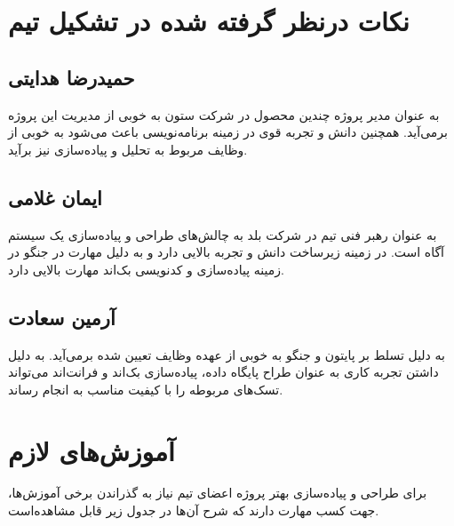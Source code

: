 \section{نکات درنظر گرفته شده در تشکیل تیم}
\subsection{حمیدرضا هدایتی}
به عنوان مدیر پروژه چندین محصول در شرکت ستون به خوبی از مدیریت این پروژه برمی‌آید. همچنین دانش و تجربه قوی در زمینه برنامه‌نویسی باعث می‌شود به خوبی از وظایف مربوط به تحلیل و پیاده‌سازی نیز برآید.
 \subsection{ایمان غلامی}
به عنوان رهبر فنی تیم در شرکت بلد به چالش‌های طراحی و پیاده‌سازی یک سیستم آگاه است. در زمینه زیرساخت دانش و تجربه بالایی دارد و به دلیل مهارت در جنگو در زمینه پیاده‌سازی و کدنویسی بک‌اند مهارت بالایی دارد.
\subsection{آرمین سعادت}
به دلیل تسلط بر پایتون و جنگو به خوبی از عهده وظایف تعیین شده برمی‌آید. به دلیل داشتن تجربه کاری به عنوان طراح پایگاه داده، پیاده‌سازی بک‌اند و فرانت‌اند می‌تواند تسک‌های مربوطه را با کیفیت مناسب به انجام رساند.

\section{آموزش‌های لازم}
برای طراحی و پیاده‌سازی بهتر پروژه اعضای تیم نیاز به گذراندن برخی آموزش‌ها، جهت کسب مهارت دارند که شرح آن‌ها در جدول 
زیر
قابل مشاهده‌است.


\begin{table}[H]
	\centering
	\label{training_table}
\end{table}

